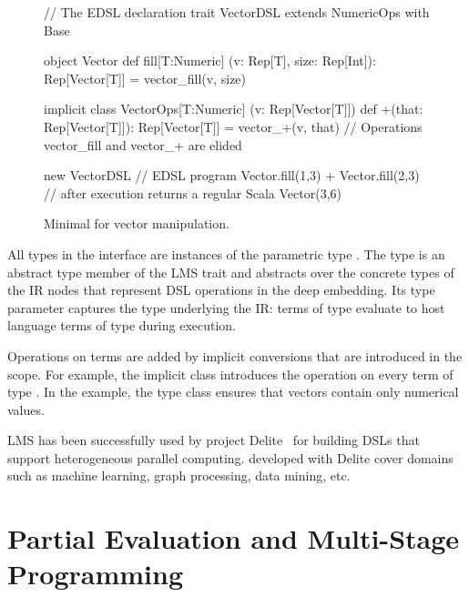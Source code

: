 \begin{figure}
\begin{listingtiny}
// The EDSL declaration
trait VectorDSL extends NumericOps with Base {
  object Vector {
    def fill[T:Numeric]
      (v: Rep[T], size: Rep[Int]): Rep[Vector[T]] =
      vector_fill(v, size)
  }

  implicit class VectorOps[T:Numeric]
    (v: Rep[Vector[T]]) {
    def +(that: Rep[Vector[T]]): Rep[Vector[T]] =
      vector_+(v, that)
  }
  // Operations vector_fill and vector_+ are elided
}

new VectorDSL { // EDSL program
  Vector.fill(1,3) + Vector.fill(2,3)
} // after execution returns a regular Scala Vector(3,6)
\end{listingtiny}
\caption{\label{lst:lms} Minimal \edsl for vector manipulation.}
\end{figure}

All types in the  interface are instances of the
parametric type .  The  type is an abstract
type member of the  LMS trait and abstracts over the
concrete types of the IR nodes that represent DSL operations in the
deep embedding.  Its type parameter captures the type underlying the
IR: \edsl terms of type  evaluate to host language terms
of type  during \edsl execution.

Operations on  terms are added by implicit conversions that are introduced in the \edsl scope. For example, the implicit class  introduces the \code{+} operation on every term of type . In the example, the type class  ensures that vectors contain only numerical values.

LMS has been successfully used by project Delite~\cite{brown_heterogeneous_2011,composition-ecoop2013} for building DSLs that support heterogeneous parallel computing. \edsls developed with Delite cover domains
such as machine learning, graph processing, data mining, etc.

\section{Partial Evaluation and Multi-Stage Programming}
\label{sec:partial-evaluation}
